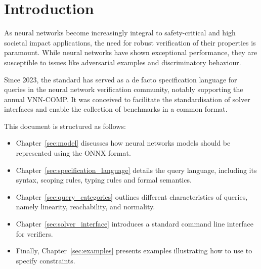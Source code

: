 \chapter{Introduction}
\label{sec:intro}

As neural networks become increasingly integral to safety-critical and high societal impact applications\cite{1, 2, 3}, 
the need for robust verification of their properties is paramount. While neural networks have shown exceptional performance, 
they are susceptible to issues like adversarial examples\cite{3} and discriminatory behaviour\cite{4}.

Since 2023, the \vnnlib{} standard\cite{5} has served as a de facto specification language for queries in the neural network verification 
community, notably supporting the annual VNN-COMP\cite{7}. It was conceived to facilitate the standardisation of solver interfaces and 
enable the collection of benchmarks in a common format. 

This document is structured as follows:
\begin{itemize}
\item Chapter~\ref{sec:model} discusses how neural networks models should be represented using the ONNX format.
\item Chapter~\ref{sec:specification_language} details the \vnnlib{} query language, including its syntax, scoping rules, typing rules and formal semantics.
\item Chapter~\ref{sec:query_categories} outlines different characteristics of queries, namely linearity, 
reachability, and normality.
\item  Chapter~\ref{sec:solver_interface} introduces a standard command line interface for verifiers.
\item Finally, Chapter~\ref{sec:examples} 
presents examples illustrating how to use \vnnlib{} to specify constraints.
\end{itemize}
